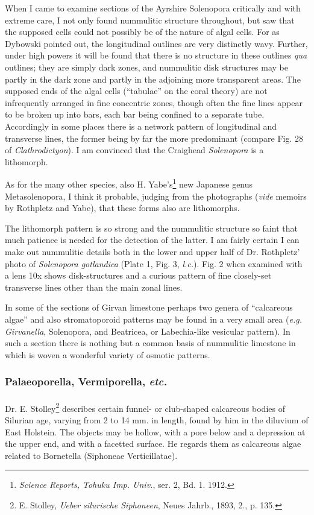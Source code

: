 \documentclass[a4paper, 12pt, oneside]{article}
\begin{document}
When I came to examine sections of the Ayrshire Solenopora critically and with extreme care, I not only found nummulitic structure throughout, but saw that the supposed cells could not possibly be of the nature of algal cells. For as Dybowski pointed out, the longitudinal outlines are very distinctly wavy. Further, under high powers it will be found that there is no structure in these outlines \emph{qua} outlines; they are simply dark zones, and nummulitic disk structures may be partly in the dark zone and partly in the adjoining more transparent areas. The supposed ends of the algal cells (``tabulae'' on the coral theory) are not infrequently arranged in fine concentric zones, though often the fine lines appear to be broken up into bars, each bar being confined to a separate tube. Accordingly in some places there is a network pattern of longitudinal and transverse lines, the former being by far the more predominant (compare Fig. 28 of \emph{Clathrodictyon}). I am convinced that the Craighead \emph{Solenopora} is a lithomorph.

As for the many other species, also H. Yabe's\footnote{\emph{Science Reports, Tohuku Imp. Univ.}, ser. 2, Bd. 1. 1912.} new Japanese genus Metasolenopora, I think it probable, judging from the photographs (\emph{vide} memoirs by Rothpletz and Yabe), that these forms also are lithomorphs.

The lithomorph pattern is so strong and the nummulitic structure so faint that much patience is needed for the detection of the latter. I am fairly certain I can make out nummulitic details both in the lower and upper half of Dr. Rothpletz' photo of \emph{Solenopora gotlandica} (Plate 1, Fig. 3, \emph{l.c.}). Fig. 2 when examined with a lens 10x shows disk-structures and a curious pattern of fine closely-set transverse lines other than the main zonal lines.

In some of the sections of Girvan limestone perhaps two genera of ``calcareous algae'' and also stromatoporoid patterns may be found in a very small area (\emph{e.g.} \emph{Girvanella}, Solenopora, and Beatricea, or Labechia-like vesicular pattern). In such a section there is nothing but a common basis of nummulitic limestone in which is woven a wonderful variety of osmotic patterns.

\subsubsection{Palaeoporella, Vermiporella, \emph{etc.}}
\paragraph{}
Dr. E. Stolley\footnote{E. Stolley, \emph{Ueber silurische Siphoneen}, Neues Jahrb., 1893, 2., p. 135.} describes certain funnel- or club-shaped calcareous bodies of Silurian age, varying from 2 to 14 mm. in length, found by him in the diluvium of East Holstein. The objects may be hollow, with a pore below and a depression at the upper end, and with a facetted surface. He regards them as calcareous algae related to Bornetella (Siphoneae Verticillatae).
\end{document}
